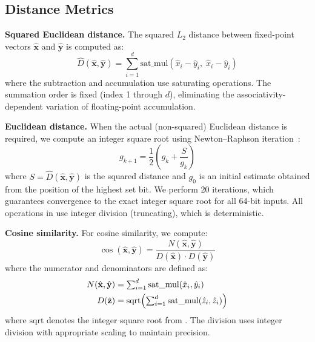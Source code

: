 \documentclass[10pt,journal,compsoc]{IEEEtran}
\begin{document}
\subsection{Distance Metrics}

\textbf{Squared Euclidean distance.} The squared $L_2$ distance between fixed-point vectors $\hat{\mathbf{x}}$ and $\hat{\mathbf{y}}$ is computed as:
\begin{equation}
  \label{eq:fp_l2}
  \hat{D}(\hat{\mathbf{x}}, \hat{\mathbf{y}}) = \sum_{i=1}^{d} \text{sat\_mul}(\hat{x}_i - \hat{y}_i,\; \hat{x}_i - \hat{y}_i)
\end{equation}
where the subtraction and accumulation use saturating operations. The summation order is fixed (index 1 through $d$), eliminating the associativity-dependent variation of floating-point accumulation.

\textbf{Euclidean distance.} When the actual (non-squared) Euclidean distance is required, we compute an integer square root using Newton--Raphson iteration~\cite{schoenmakers2023fixedpoint}:
\begin{equation}
  \label{eq:newton}
  g_{k+1} = \frac{1}{2}\left(g_k + \frac{S}{g_k}\right)
\end{equation}
where $S = \hat{D}(\hat{\mathbf{x}}, \hat{\mathbf{y}})$ is the squared distance and $g_0$ is an initial estimate obtained from the position of the highest set bit. We perform 20 iterations, which guarantees convergence to the exact integer square root for all 64-bit inputs. All operations in  use integer division (truncating), which is deterministic.

\textbf{Cosine similarity.} For cosine similarity, we compute:
\begin{equation}
  \cos(\hat{\mathbf{x}}, \hat{\mathbf{y}}) = \frac{N(\hat{\mathbf{x}}, \hat{\mathbf{y}})}{D(\hat{\mathbf{x}}) \cdot D(\hat{\mathbf{y}})}
\end{equation}
where the numerator and denominators are defined as:
\begin{align}
  N(\hat{\mathbf{x}}, \hat{\mathbf{y}}) &= \textstyle\sum_{i=1}^{d} \text{sat\_mul}(\hat{x}_i, \hat{y}_i) \notag\\
  D(\hat{\mathbf{z}}) &= \mathrm{sqrt}\!\left(\textstyle\sum_{i=1}^{d} \text{sat\_mul}(\hat{z}_i, \hat{z}_i)\right)
\end{align}
where $\mathrm{sqrt}$ denotes the integer square root from . The division uses integer division with appropriate scaling to maintain precision.
\end{document}
